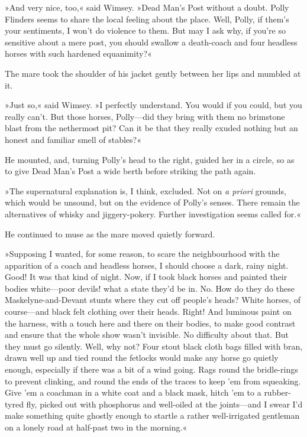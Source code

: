 »And very nice, too,« said Wimsey. »Dead Man's Post without a doubt. Polly Flinders seems to share the local feeling about the place. Well, Polly, if them's your sentiments, I won't do violence to them. But may I ask why, if you're so sensitive about a mere post, you should swallow a death-coach and four headless horses with such hardened equanimity?«

The mare took the shoulder of his jacket gently between her lips and mumbled at it.

»Just so,« said Wimsey. »I perfectly understand. You would if you could, but you really can't. But those horses, Polly—did they bring with them no brimstone blast from the nethermost pit? Can it be that they really exuded nothing but an honest and familiar smell of stables?«

He mounted, and, turning Polly's head to the right, guided her in a circle, so as to give Dead Man's Post a wide berth before striking the path again.

»The supernatural explanation is, I think, excluded. Not on \textit{a priori} grounds, which would be unsound, but on the evidence of Polly's senses. There remain the alternatives of whisky and jiggery-pokery. Further investigation seems called for.«

He continued to muse as the mare moved quietly forward.

»Supposing I wanted, for some reason, to scare the neighbourhood with the apparition of a coach and headless horses, I should choose a dark, rainy night. Good! It was that kind of night. Now, if I took black horses and painted their bodies white—poor devils! what a state they'd be in. No. How do they do these Maskelyne-and-Devant stunts where they cut off people's heads? White horses, of course—and black felt clothing over their heads. Right! And luminous paint on the harness, with a touch here and there on their bodies, to make good contrast and ensure that the whole show wasn't invisible. No difficulty about that. But they must go silently. Well, why not? Four stout black cloth bags filled with bran, drawn well up and tied round the fetlocks would make any horse go quietly enough, especially if there was a bit of a wind going. Rags round the bridle-rings to prevent clinking, and round the ends of the traces to keep 'em from squeaking. Give 'em a coachman in a white coat and a black mask, hitch 'em to a rubber-tyred fly, picked out with phosphorus and well-oiled at the joints—and I swear I'd make something quite ghostly enough to startle a rather well-irrigated gentleman on a lonely road at half-past two in the morning.«

